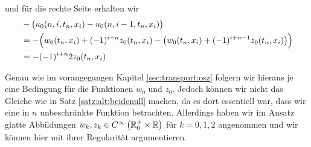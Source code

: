 und für die rechte Seite erhalten wir
\begin{align}\label{eq:appendix:kleineta:oh:rechteseite}
&- \bigl( u_0(n, i, t_n, x_i) - u_0(n, i-1, t_n, x_i) \bigr)\\
&= -\Bigl( w_0(t_n, x_i) + (-1)^{i+n} z_0(t_n, x_i) - \bigl( w_0(t_n, x_i) + (-1)^{i+n-1} z_0(t_n, x_i) \bigr) \Bigr) \nonumber\\
&= - (-1)^{i+n} 2 z_0(t_n,x_i) 
\end{align}

Genau wie im vorangegangen Kapitel \ref{sec:transport:osz} folgern wir hieraus je eine Bedingung für die Funktionen $w_0$ und $z_0$.
Jedoch können wir nicht das Gleiche wie in Satz \ref{satz:alt:beidenull} machen, da es dort essentiell war, dass wir eine in $n$ unbeschränkte Funktion betrachten.
Allerdings haben wir im Ansatz glatte Abbildungen $w_k, z_k \in C^{\infty}\left( \mathbb R^+_0 \times \mathbb R \right)$ für $k = 0,1,2$ angenommen und wir können hier mit ihrer Regularität argumentieren.
\\

